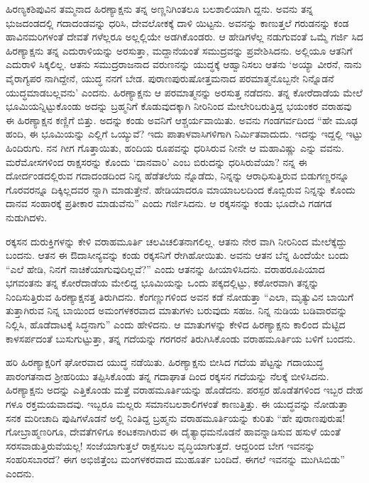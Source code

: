 ಹಿರಣ್ಯಕಶಿಪುವಿನ ತಮ್ಮನಾದ ಹಿರಣ್ಯಾಕ್ಷನು ತನ್ನ ಅಣ್ಣನಿಗಿಂತಲೂ ಬಲಶಾಲಿಯಾಗಿ ದ್ದನು. ಅವನು ತನ್ನ ಭುಜದಂಡದಲ್ಲಿ ಗದಾದಂಡವನ್ನು ಧರಿಸಿ, ದೇವಲೋಕಕ್ಕೆ ದಾಳಿ ಯಿಟ್ಟನು. ಅವನನ್ನು ಕಾಣುತ್ತಲೆ ಗರುಡನನ್ನು ಕಂಡ ಹಾವಿನಮರಿಗಳಂತೆ ದೇವತೆ ಗಳೆಲ್ಲರೂ ಅಲ್ಲಲ್ಲಿಯೇ ಅಡಗಿಕೊಂಡರು. ಆ ಹೇಡಿಗಳೆಲ್ಲ ನಡುಗುವಂತೆ ಒಮ್ಮೆ ಗರ್ಜಿ ಸಿದ ಹಿರಣ್ಯಾಕ್ಷನು ತನ್ನ ಎದುರಾಳಿಯನ್ನು ಅರಸುತ್ತಾ, ಮದ್ದಾನೆಯಂತೆ ಸಮುದ್ರವನ್ನು ಪ್ರವೇಶಿಸಿದನು. ಅಲ್ಲಿಯೂ ಆತನಿಗೆ ಎದುರಾಳಿ ಸಿಕ್ಕಲಿಲ್ಲ. ಆತನು ಸಮುದ್ರರಾಜನಾದ ವರುಣನನ್ನು ಯುದ್ಧಕ್ಕೆ ಆಹ್ವಾನಿಸಲು ಆತನು ‘ಅಯ್ಯಾ ವೀರನೆ, ನಾನು ವೈರಾಗ್ಯಪರ ನಾಗಿದ್ದೇನೆ, ಯುದ್ಧ ನನಗೆ ಬೇಡ. ಪುರಾಣಪುರುಷೋತ್ತಮನಾದ ಪರಮಾತ್ಮನೊಬ್ಬನೇ ನಿನ್ನೊಡನೆ ಯುದ್ಧಮಾಡಬಲ್ಲವನು’ ಎಂದನು. ಹಿರಣ್ಯಾಕ್ಷನು ಆ ಪರಮಾತ್ಮನನ್ನು ಅರಸುತ್ತ ನಡೆದನು. ತನ್ನ ಕೋರೆದಾಡೆಯ ಮೇಲೆ ಭೂಮಿಯನ್ನಿಟ್ಟುಕೊಂಡು ಅದನ್ನು ಬ್ರಹ್ಮನಿಗೆ ಕೊಡುವುದಕ್ಕಾಗಿ ನೀರಿನಿಂದ ಮೇಲೇರಿಬರುತ್ತಿದ್ದ ಭಯಂಕರ ವರಾಹವು ಈ ಹಿರಣ್ಯಾಕ್ಷನ ಕಣ್ಣಿಗೆ ಬಿತ್ತು. ಅದನ್ನು ಕಂಡು ಅವನಿಗೆ ಆಶ್ಚರ್ಯವಾಯಿತು. ಅವನು ಗಂಡಗರ್ವದಿಂದ “ಹೇ ಮೂಢ ಹಂದಿ, ಈ ಭೂಮಿಯನ್ನು ಎಲ್ಲಿಗೆ ಒಯ್ಯುವೆ? ಇದು ಪಾತಾಳವಾಸಿಗಳಿಗಾಗಿ ನಿರ್ಮಿತವಾದುದು. ಇದನ್ನು ಇದ್ದಲ್ಲಿ ಇಟ್ಟು ಹಿಂದಿರುಗು. ನನ ಗೀಗ ಗೊತ್ತಾಯಿತು, ಹಂದಿಯ ರೂಪವನ್ನು ಧರಿಸಿರುವ ನೀನೇ ಆ ಮಹಾವಿಷ್ಣು ಎನ್ನು ವವನು. ಮರೆಮೋಸಗಳಿಂದ ರಾಕ್ಷಸರನ್ನು ಕೊಂದು ‘ದಾನವಾರಿ’ ಎಂಬ ಬಿರುದನ್ನು ಧರಿಸಿರುವೆಯಾ? ನನ್ನ ಈ ದೋರ್ದಂಡದಲ್ಲಿರುವ ಗದಾದಂಡದಿಂದ ನಿನ್ನ ಹೆಡೆತಲೆಯ ನ್ನೊಡೆದು, ನಿನ್ನನ್ನು ಆರಾಧಿಸುತ್ತಿರುವ ಬಿಡುಗಣ್ಣರನ್ನೂ ಗೊರವರನ್ನೂ ದಿಕ್ಕಿಲ್ಲದವರ ನ್ನಾಗಿ ಮಾಡುತ್ತೇನೆ. ಹೇಡಿಯಾದರೂ ಮಾಯಾಬಲದಿಂದ ಕೊಬ್ಬಿರುವ ನಿನ್ನನ್ನು ಕೊಂದು ದಾನವ ಸಂಹಾರಕ್ಕೆ ಪ್ರತೀಕಾರ ಮಾಡುವೆನು” ಎಂದು ಗರ್ಜಿಸಿದನು. ಆ ರಕ್ಕಸನನ್ನು ಕಂಡು ಭೂದೇವಿ ಗಡಗಡ ನುಡುಗಿದಳು.

ರಕ್ಕಸನ ದುರುಕ್ತಿಗಳನ್ನು ಕೇಳಿ ವರಾಹಮೂರ್ತಿ ಚಲವಿಚಲಿತನಾಗಲಿಲ್ಲ. ಆತನು ನೇರ ವಾಗಿ ನೀರಿನಿಂದ ಮೇಲೆಕ್ಕೆದ್ದು ಬಂದನು. ಆತನ ಈ ಔದಾಸೀನ್ಯವನ್ನು ಕಂಡು ರಕ್ಕಸನಿಗೆ ರೇಗಿಹೋಯಿತು. ಅವನು ಆತನ ಬೆನ್ನ ಹಿಂದೆಯೇ ಬಂದು “ಎಲೆ ಹೇಡಿ, ನಿನಗೆ ನಾಚಿಕೆಯಾಗುವುದಿಲ್ಲವೆ?” ಎಂದು ಆತನನ್ನು ಹೀಯಾಳಿಸಿದನು. ವರಾಹರೂಪಿಯಾದ ಭಗವಂತನು ತನ್ನ ಕೋರೆದಾಡೆಯ ಮೇಲಿದ್ದ ಭೂಮಿಯನ್ನು ಒಂದು ಪಕ್ಕದಲ್ಲಿಟ್ಟು, ಕಠೋರವಾಗಿ ತನ್ನನ್ನು ನಿಂದಿಸುತ್ತಿರುವ ಹಿರಣ್ಯಾಕ್ಷನತ್ತ ತಿರುಗಿದನು. ಕೆಂಗಣ್ಣುಗಳಿಂದ ಅವನ ಕಡೆ ನೋಡುತ್ತಾ “ಎಲಾ, ಮೃತ್ಯುವಿನ ಬಾಯಿಗೆ ತುತ್ತಾಗಿರುವ ನಿನ್ನ ಬಾಯಿಂದ ಅಮಂಗಳಕರವಾದ ಮಾತುಗಳು ಬರುವುದು ಸಹಜ. ನಿನ್ನ ನುಡಿಯ ಬಡಿವಾರವನ್ನು ನಿಲ್ಲಿಸಿ, ಹೊಡೆದಾಟಕ್ಕೆ ಸಿದ್ಧನಾಗು” ಎಂದು ಹೇಳಿದನು. ಆ ಮಾತುಗಳನ್ನು ಕೇಳಿದ ಹಿರಣ್ಯಾಕ್ಷನು ಕಾಲಿಂದ ಮೆಟ್ಟಿದ ಕಾಳಸರ್ಪದಂತೆ ಬುಸುಗುಟ್ಟುತ್ತಾ, ತನ್ನ ಗದೆಯನ್ನು ಗರಗರನೆ ತಿರುಗಿಸಿಕೊಂಡು ವರಾಹಮೂರ್ತಿಯ ಬಳಿಗೆ ಬಂದನು. 

ಹರಿ ಹಿರಣ್ಯಾಕ್ಷರಿಗೆ ಘೋರವಾದ ಯುದ್ಧ ನಡೆಯಿತು. ಹಿರಣ್ಯಾಕ್ಷನು ಬೀಸಿದ ಗದೆಯ ಪೆಟ್ಟನ್ನು ಗದಾಯುದ್ಧ ಪಾರಂಗತನಾದ ಶ್ರೀಹರಿಯು ತಪ್ಪಿಸಿಕೊಂಡು ತನ್ನ ಗದಾಘಾತ ದಿಂದ ರಕ್ಕಸನ ಗದೆಯನ್ನು ನೆಲಕ್ಕೆ ಬೀಳಿಸಿದನು. ಹಿರಣ್ಯಾಕ್ಷನು ಅದನ್ನು ಎತ್ತಿಕೊಂಡು ಮತ್ತೆ ವರಾಹಮೂರ್ತಿಯನ್ನು ಹೊಡೆದನು. ಪರಸ್ಪರ ಹೊಡೆತಗಳಿಂದ ಇಬ್ಬರ ದೇಹ ಗಳೂ ರಕ್ತಮಯವಾದವು. ಇಬ್ಬರೂ ಮಲ್ಲರು ಸಮಾನಬಲಶಾಲಿಗಳಂತೆ ಕಾಣುತ್ತಿತ್ತು. ಈ ಯುದ್ಧವನ್ನು ನೋಡುತ್ತಾ ಸನಕ ಮರೀಚಾದಿ ಪುಷಿಗಳೊಡನೆ ಅಲ್ಲಿ ನಿಂತಿದ್ದ ಬ್ರಹ್ಮನು ವರಾಹಮೂರ್ತಿಯನ್ನು ಕುರಿತು “ಹೇ ಪುರಾಣಪುರುಷ! ಗೋಬ್ರಾಹ್ಮಣರಿಗೂ, ದೇವತೆಗಳಿಗೂ ಕಂಟಕನಾಗಿರುವ ಈ ದೈತ್ಯಾಧಮನೊಡನೆ ಹಾವನ್ನಾಡಿಸುವ ಹಸುಳೆ ಯಂತೆ ಸರಸವಾಡುತ್ತಿರುವೆಯಲ್ಲ! ಸಂಜೆಯಾಗುತ್ತಲೆ ರಾಕ್ಷಸಬಲ ವೃದ್ಧಿಯಾಗುತ್ತದೆ. ಆದ್ದರಿಂದ ಬೇಗ ಇವನನ್ನು ಸಂಹರಿಸಬಾರದೆ? ಈಗ ಅಭಿಜಿತ್ತೆಂಬ ಮಂಗಳಕರವಾದ ಮುಹೂರ್ತ ಬಂದಿದೆ. ಈಗಲೆ ಇವನನ್ನು ಮುಗಿಸಿಬಿಡು” ಎಂದನು. 


